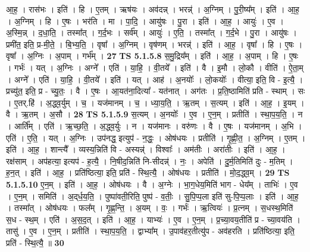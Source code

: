 \documentclass[17pt]{extarticle}
\begin{document}
                  आ॒ह॒ । रास॑भः । इति॑ । हि । ए॒तम् । ऋष॑यः । अव॑दन्न् । भरन्न्॑ । अ॒ग्निम् । पु॒री॒ष्य᳚म् । इति॑ । आ॒ह॒ । अ॒ग्निम् । हि । ए॒षः । भर॑ति । मा । पा॒दि॒ । आयु॑षः । पु॒रा । इति॑ । आ॒ह॒ । आयुः॑ । ए॒व । अ॒स्मि॒न्न् । द॒धा॒ति॒ । तस्मा᳚त् । ग॒र्द॒भः । सर्व᳚म् । आयुः॑ । ए॒ति॒ । तस्मा᳚त् । ग॒र्द॒भे । पु॒रा । आयु॑षः । प्रमी॑त॒ इति॒ प्र-मी॒ते॒ । बि॒भ्य॒ति॒ । वृषा᳚ । अ॒ग्निम् । वृष॑णम् । भरन्न्॑ । इति॑ । आ॒ह॒ । वृषा᳚ । हि । ए॒षः । वृषा᳚ । अ॒ग्निः । अ॒पाम् । गर्भ᳚म् । \textbf{  27} \newline
                  \newline
                                \textbf{ TS 5.1.5.8} \newline
                  स॒मु॒द्रिय᳚म् । इति॑ । आ॒ह॒ । अ॒पाम् । हि । ए॒षः । गर्भः॑ । यत् । अ॒ग्निः । अग्ने᳚ । एति॑ । या॒हि॒ । वी॒तये᳚ । इति॑ । वै । इ॒मौ । लो॒कौ । वीति॑ । ऐ॒ता॒म् । अग्ने᳚ । एति॑ । या॒हि॒ । वी॒तये᳚ । इति॑ । यत् । आह॑ । अ॒नयोः᳚ । लो॒कयोः᳚ । वीत्या॒ इति॒ वि - इ॒त्यै॒ । प्रच्यु॑त॒ इति॒ प्र - च्यु॒तः॒ । वै । ए॒षः । आ॒यत॑ना॒दित्या᳚ - यत॑नात् । अग॑तः । प्र॒ति॒ष्ठामिति॑ प्रति - स्थाम् । सः । ए॒तर्.हि॑ । अ॒द्ध्व॒र्युम् । च॒ । यज॑मानम् । च॒ । ध्या॒य॒ति॒ । ऋ॒तम् । स॒त्यम् । इति॑ । आ॒ह॒ । इ॒यम् । वै । ऋ॒तम् । अ॒सौ । \textbf{  28} \newline
                  \newline
                                \textbf{ TS 5.1.5.9} \newline
                  स॒त्यम् । अ॒नयोः᳚ । ए॒व । ए॒न॒म् । प्रतीति॑ । स्था॒प॒य॒ति॒ । न । आर्ति᳚म् । एति॑ । ऋ॒च्छ॒ति॒ । अ॒द्ध्व॒र्युः । न । यज॑मानः । वरु॑णः । वै । ए॒षः । यज॑मानम् । अ॒भि । एति॑ । ए॒ति॒ । यत् । अ॒ग्निः । उप॑नद्ध॒ इत्युप॑ - न॒द्धः॒ । ओष॑धयः । प्रतीति॑ । गृ॒ह्णी॒त॒ । अ॒ग्निम् । ए॒तम् । इति॑ । आ॒ह॒ । शान्त्यै᳚ । व्यस्य॒न्निति॑ वि - अस्यन्न्॑ । विश्वाः᳚ । अम॑तीः । अरा॑तीः । इति॑ । आ॒ह॒ । रक्ष॑साम् । अप॑हत्या॒ इत्यप॑ - ह॒त्यै॒ । नि॒षीद॒न्निति॑ नि-सीदन्न्॑ । नः॒ । अपेति॑ । दु॒र्म॒तिमिति॑ दुः - म॒तिम् । ह॒न॒त् । इति॑ । आ॒ह॒ । प्रति॑ष्ठित्या॒ इति॒ प्रति॑ - स्थि॒त्यै॒ । ओष॑धयः । प्रतीति॑ । मो॒द॒द्ध्व॒म् । \textbf{  29} \newline
                  \newline
                                \textbf{ TS 5.1.5.10} \newline
                  ए॒न॒म् । इति॑ । आ॒ह॒ । ओष॑धयः । वै । अ॒ग्नेः । भा॒ग॒धेय॒मिति॑ भाग - धेय᳚म् । ताभिः॑ । ए॒व । ए॒न॒म् । समिति॑ । अ॒द्‌र्ध॒य॒ति॒ । पुष्पा॑वती॒रिति॒ पुष्प॑ - व॒तीः॒ । सु॒पि॒प्प॒ला इति॑ सु-पि॒प्प॒लाः । इति॑ । आ॒ह॒ । तस्मा᳚त् । ओष॑धयः । फल᳚म् । गृ॒ह्ण॒न्ति॒ । अ॒यम् । वः॒ । गर्भः॑ । ऋ॒त्वियः॑ । प्र॒त्नम् । स॒धस्थ॒मिति॑ स॒ध - स्थ॒म् । एति॑ । अ॒स॒द॒त् । इति॑ । आ॒ह॒ । याभ्यः॑ । ए॒व । ए॒न॒म् । प्र॒च्या॒वय॒तीति॑ प्र - च्या॒वय॑ति । तासु॑ । ए॒व । ए॒न॒म् । प्रतीति॑ । स्था॒प॒य॒ति॒ । द्वाभ्या᳚म् । उ॒पाव॑हर॒तीत्यु॑प - अव॑हरति । प्रति॑ष्ठित्या॒ इति॒ प्रति॑ - स्थि॒त्यै॒ ॥ \textbf{  30} \newline
\end{document}
